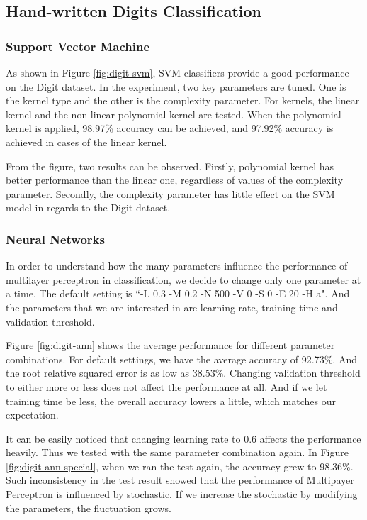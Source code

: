 \documentclass[11pt]{article}
\begin{document}
\subsection{Hand-written Digits Classification}
\subsubsection{Support Vector Machine}

As shown in Figure \ref{fig:digit-svm}, SVM classifiers provide a good performance on the Digit dataset. In the experiment, two key parameters are tuned. One is the kernel type and the other is the complexity parameter. For kernels, the linear kernel and the non-linear polynomial kernel are tested. When the polynomial kernel is applied, 98.97\% accuracy can be achieved, and 97.92\% accuracy is achieved in cases of the linear kernel. 

From the figure, two results can be observed. Firstly, polynomial kernel has better performance than the linear one, regardless of values of the complexity parameter. Secondly, the complexity parameter has little effect on the SVM model in regards to the Digit dataset. 

\subsubsection{Neural Networks}
In order to understand how the many parameters influence the performance of multilayer perceptron in classification, we decide to change only one parameter at a time. The default setting is ``-L 0.3 -M 0.2 -N 500 -V 0 -S 0 -E 20 -H a". And the parameters that we are interested in are learning rate, training time and validation threshold.

Figure \ref{fig:digit-ann} shows the average performance for different parameter combinations. For default settings, we have the average accuracy of 92.73\%. And the root relative squared error is as low as 38.53\%. Changing validation threshold to either more or less does not affect the performance at all. And if we let training time be less, the overall accuracy lowers a little, which matches our expectation.

It can be easily noticed that changing learning rate to 0.6 affects the performance heavily. Thus we tested with the same parameter combination again. In Figure \ref{fig:digit-ann-special}, when we ran the test again, the accuracy grew to 98.36\%. Such inconsistency in the test result showed that the performance of Multipayer Perceptron is influenced by stochastic. If we increase the stochastic by modifying the parameters, the fluctuation grows.
\end{document}
